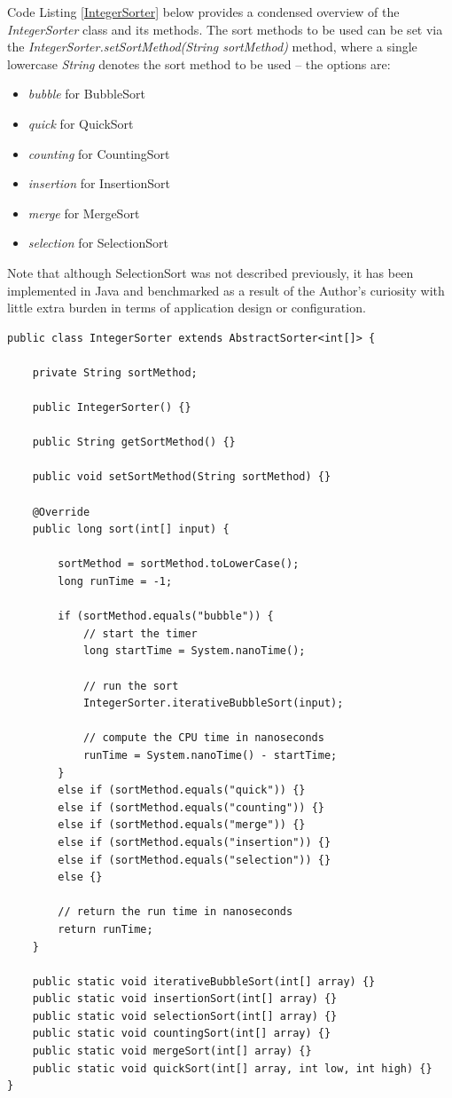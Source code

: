 \documentclass[12pt,a4paper]{article}
\begin{document}
Code Listing \ref{IntegerSorter} below provides a condensed overview of the \emph{IntegerSorter} class and its methods. The sort methods to be used can be set via the \emph{IntegerSorter.setSortMethod(String sortMethod)} method, where a single lowercase \emph{String} denotes the sort method to be used -- the options are:

\begin{itemize}
\item \emph{bubble} for BubbleSort
\item \emph{quick} for QuickSort
\item \emph{counting} for CountingSort
\item \emph{insertion} for InsertionSort
\item \emph{merge} for MergeSort
\item \emph{selection} for SelectionSort
\end{itemize}  

Note that although SelectionSort was not described previously, it has been implemented \cite{selection_sort} in Java and benchmarked as a result of the Author's curiosity with little extra burden in terms of application design or configuration.



\begin{lstlisting}[caption={An overview of the \emph{IntegerSorter} class and its methods.},captionpos=b, label={IntegerSorter}]
public class IntegerSorter extends AbstractSorter<int[]> {

	private String sortMethod;
	
	public IntegerSorter() {}
	
	public String getSortMethod() {}

	public void setSortMethod(String sortMethod) {}
	
	@Override
	public long sort(int[] input) {

		sortMethod = sortMethod.toLowerCase();
		long runTime = -1;

		if (sortMethod.equals("bubble")) {
			// start the timer
			long startTime = System.nanoTime(); 
			
			// run the sort
			IntegerSorter.iterativeBubbleSort(input); 
			
			// compute the CPU time in nanoseconds
			runTime = System.nanoTime() - startTime; 
		}
		else if (sortMethod.equals("quick")) {}
		else if (sortMethod.equals("counting")) {}
		else if (sortMethod.equals("merge")) {}
		else if (sortMethod.equals("insertion")) {}
		else if (sortMethod.equals("selection")) {}
		else {}
		
		// return the run time in nanoseconds
		return runTime;
	}	
	
	public static void iterativeBubbleSort(int[] array) {}
	public static void insertionSort(int[] array) {}
	public static void selectionSort(int[] array) {}
	public static void countingSort(int[] array) {}
	public static void mergeSort(int[] array) {}
	public static void quickSort(int[] array, int low, int high) {}
}
\end{lstlisting}
\end{document}
